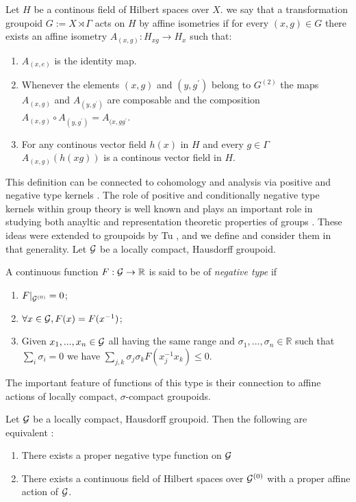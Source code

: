 \begin{definition}
Let $H$ be a continous field of Hilbert spaces over $X$. we say that a transformation groupoid $G:=X\rtimes \Gamma$ acts on $H$ by affine isometries if for every $(x,g) \in G$ there exists an affine isometry $A_{(x,g)}:H_{xg}\rightarrow H_{x}$ such that:
\begin{enumerate}
\item $A_{(x,e)}$ is the identity map.
\item Whenever the elements $(x,g)$ and $(y,g^{'})$ belong to $G^{(2)}$ the maps $A_{(x,g)}$ and $A_{(y,g^{'})}$ are composable and the composition $A_{(x,g)}\circ A_{(y,g^{'})}=A_{(x,gg^{'}}$.
\item For any continous vector field $h(x)$ in $H$ and every $g \in \Gamma$ $A_{(x,g)}(h(xg))$ is a continous vector field in $H$.
\end{enumerate}
\end{definition}

This definition can be connected to cohomology and analysis via positive and negative type kernels \cite{MR2415834,MR2158394}. The role of positive and conditionally negative type kernels within group theory is well known and plays an important role in studying both anayltic and representation theoretic properties of groups \cite{MR2415834,MR1487204}. These ideas were extended to groupoids by Tu \cite{MR1703305}, and we define and consider them in that generality. Let $\mathcal{G}$ be a locally compact, Hausdorff groupoid.

\begin{definition}
A continuous function $F: \mathcal{G} \rightarrow \mathbb{R}$ is said to be of \textit{negative type} if 
\begin{enumerate}
\item $F|_{\mathcal{G}^{(0)}}=0$;
\item $\forall x \in \mathcal{G}, F(x)=F(x^{-1})$;
\item Given $x_{1},...,x_{n} \in \mathcal{G}$ all having the same range and $\sigma_{1},...,\sigma_{n} \in \mathbb{R}$ such that $\sum_{i}\sigma_{i}=0$ we have $\sum_{j,k}\sigma_{j}\sigma_{k}F(x_{j}^{-1}x_{k})\leq 0$.
\end{enumerate}
\end{definition}

The important feature of functions of this type is their connection to affine actions of locally compact, $\sigma$-compact groupoids.
\begin{theorem}Let $\mathcal{G}$ be a locally compact, Hausdorff groupoid. Then the following are equivalent \cite{MR1703305}:
\begin{enumerate}
\item There exists a proper negative type function on $\mathcal{G}$
\item There exists a continuous field of Hilbert spaces over $\mathcal{G}^{(0)}$ with a proper affine action of $\mathcal{G}$.
\end{enumerate}
\end{theorem}

